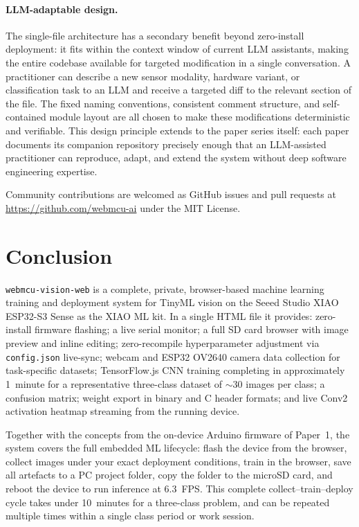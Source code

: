 \documentclass[11pt]{article}
\begin{document}
\paragraph{LLM-adaptable design.}
The single-file architecture has a secondary benefit beyond zero-install deployment:
it fits within the context window of current LLM assistants, making the entire
codebase available for targeted modification in a single conversation. A practitioner
can describe a new sensor modality, hardware variant, or classification task to an
LLM and receive a targeted diff to the relevant section of the file. The fixed naming
conventions, consistent comment structure, and self-contained module layout are all
chosen to make these modifications deterministic and verifiable. This design principle
extends to the paper series itself: each paper documents its companion repository
precisely enough that an LLM-assisted practitioner can reproduce, adapt, and extend
the system without deep software engineering expertise.

Community contributions are welcomed as GitHub issues and pull requests at
\url{https://github.com/webmcu-ai} under the MIT License.

\section{Conclusion}

\texttt{webmcu-vision-web} is a complete, private, browser-based machine learning
training and deployment system for TinyML vision on the Seeed Studio XIAO ESP32-S3
Sense as the XIAO ML kit. In a single HTML file it provides: zero-install firmware flashing; a live
serial monitor; a full SD card browser with image preview and inline editing;
zero-recompile hyperparameter adjustment via \texttt{config.json} live-sync;
webcam and ESP32 OV2640 camera data collection for task-specific datasets;
TensorFlow.js CNN training completing in approximately 1~minute for a representative
three-class dataset of $\sim$30 images per class; a confusion matrix; weight export
in binary and C header formats; and live Conv2 activation heatmap streaming from the
running device.

Together with the concepts from the on-device Arduino firmware of Paper~1, the system covers the full
embedded ML lifecycle: flash the device from the browser, collect images under your
exact deployment conditions, train in the browser, save all artefacts to a PC project
folder, copy the folder to the microSD card, and reboot the device to run inference
at 6.3~FPS. This complete collect--train--deploy cycle takes under 10~minutes for a
three-class problem, and can be repeated multiple times within a single class period
or work session.
\end{document}
